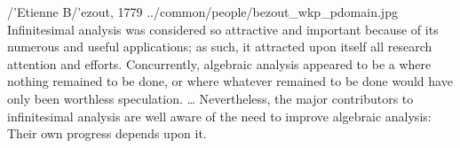 \qboxnpq
  {{/'E}tienne B{/'e}zout, 1779 \footnotemark}
  {../common/people/bezout_wkp_pdomain.jpg}
  {Infinitesimal analysis was considered so attractive and important because of its numerous and useful applications;
  as such, it attracted upon itself all research attention and efforts.
  Concurrently, algebraic analysis appeared to be a  where nothing remained to be done,
  or where whatever remained to be done would have only been worthless speculation.
  \ldots
  Nevertheless, the major contributors to infinitesimal analysis are well aware of the need to improve algebraic analysis:
  Their own progress depends upon it.}

